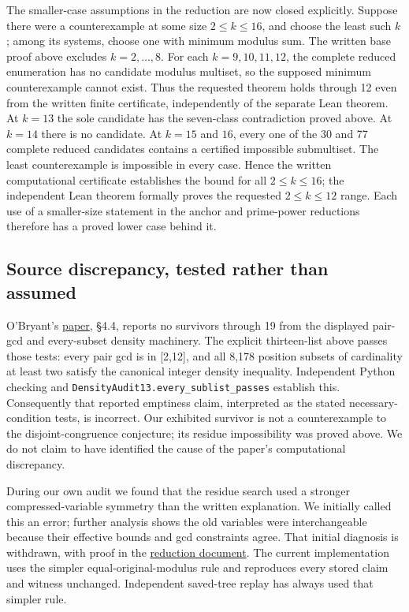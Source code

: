 \documentclass[11pt,a4paper]{article}
\begin{document}
The smaller-case assumptions in the reduction are now closed explicitly. Suppose there were a counterexample at some size \(2\le k\le16\), and choose the least such \(k\); among its systems, choose one with minimum modulus sum. The written base proof above excludes \(k=2,\ldots,8\). For each \(k=9,10,11,12\), the complete reduced enumeration has no candidate modulus multiset, so the supposed minimum counterexample cannot exist. Thus the requested theorem holds through 12 even from the written finite certificate, independently of the separate Lean theorem. At \(k=13\) the sole candidate has the seven-class contradiction proved above. At \(k=14\) there is no candidate. At \(k=15\) and \(16\), every one of the 30 and 77 complete reduced candidates contains a certified impossible submultiset. The least counterexample is impossible in every case. Hence the written computational certificate establishes the bound for all \(2\le k\le16\); the independent Lean theorem formally proves the requested \(2\le k\le12\) range. Each use of a smaller-size statement in the anchor and prime-power reductions therefore has a proved lower case behind it.

\subsection{Source discrepancy, tested rather than assumed}\label{source-discrepancy-tested-rather-than-assumed}

O'Bryant's \href{https://arxiv.org/abs/math/0604347}{paper}, \S{}4.4, reports no survivors through 19 from the displayed pair-gcd and every-subset density machinery. The explicit thirteen-list above passes those tests: every pair gcd is in {[}2,12{]}, and all 8,178 position subsets of cardinality at least two satisfy the canonical integer density inequality. Independent Python checking and \texttt{DensityAudit13.every\_sublist\_passes} establish this. Consequently that reported emptiness claim, interpreted as the stated necessary-condition tests, is incorrect. Our exhibited survivor is not a counterexample to the disjoint-congruence conjecture; its residue impossibility was proved above. We do not claim to have identified the cause of the paper's computational discrepancy.

During our own audit we found that the residue search used a stronger compressed-variable symmetry than the written explanation. We initially called this an error; further analysis shows the old variables were interchangeable because their effective bounds and gcd constraints agree. That initial diagnosis is withdrawn, with proof in the \href{https://github.com/mpelteshki/climbing-to-the-frontier/blob/212bba53b1818c08c40b8c4b48f636651eaf6410/cagent/p4/audit/reduction-proof.md}{reduction document}. The current implementation uses the simpler equal-original-modulus rule and reproduces every stored claim and witness unchanged. Independent saved-tree replay has always used that simpler rule.
\end{document}
